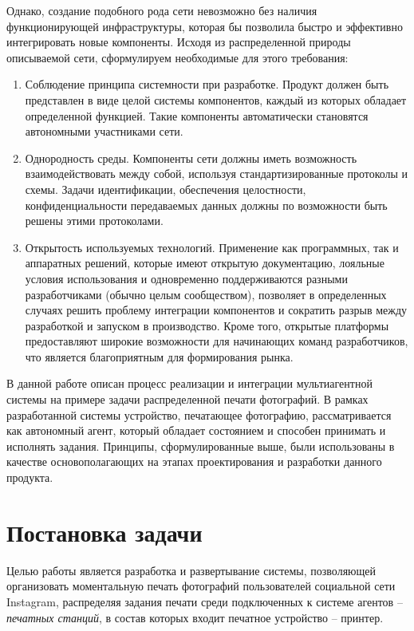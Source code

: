 \documentclass[a4paper,14pt,href]{article}
\begin{document}
Однако, создание подобного рода сети невозможно без наличия функционирующей инфраструктуры, которая бы позволила быстро и эффективно интегрировать новые компоненты. Исходя из распределенной природы описываемой сети, сформулируем необходимые для этого требования:

\begin{enumerate}
  \item Соблюдение принципа системности при разработке\cite{SystemPrinciple}. Продукт должен быть представлен в виде целой системы компонентов, каждый из которых обладает определенной функцией. Такие компоненты автоматически становятся автономными участниками сети.

  \item Однородность среды. Компоненты сети должны иметь возможность взаимодействовать между собой, используя стандартизированные протоколы и схемы. Задачи идентификации, обеспечения целостности, конфиденциальности передаваемых данных должны по возможности быть решены этими протоколами.

  \item Открытость используемых технологий. Применение как программных, так и аппаратных решений, которые имеют открытую документацию, лояльные  условия использования и одновременно поддерживаются разными разработчиками (обычно целым сообществом), позволяет в определенных случаях решить проблему интеграции компонентов и сократить разрыв между разработкой и запуском в производство. Кроме того, открытые платформы предоставляют широкие возможности для начинающих команд разработчиков, что является благоприятным для формирования рынка.
\end{enumerate}

В данной работе описан процесс реализации и интеграции муль\-тиагентной системы на примере задачи распределенной печати фотографий. В рамках разработанной системы устройство, печатающее фотографию, рассматривается как автономный агент, который обладает состоянием и способен принимать и исполнять задания. Принципы, сформулированные выше, были использованы в качестве основополагающих на этапах проектирования и разработки данного продукта.

\newpage
\section{Постановка задачи}
Целью работы является разработка и развертывание системы, позволяющей организовать моментальную печать фотографий пользователей социальной сети Instagram, распределяя задания печати среди подключенных к системе агентов -- \textit{печатных станций}, в состав которых входит печатное устройство -- принтер.
\end{document}
